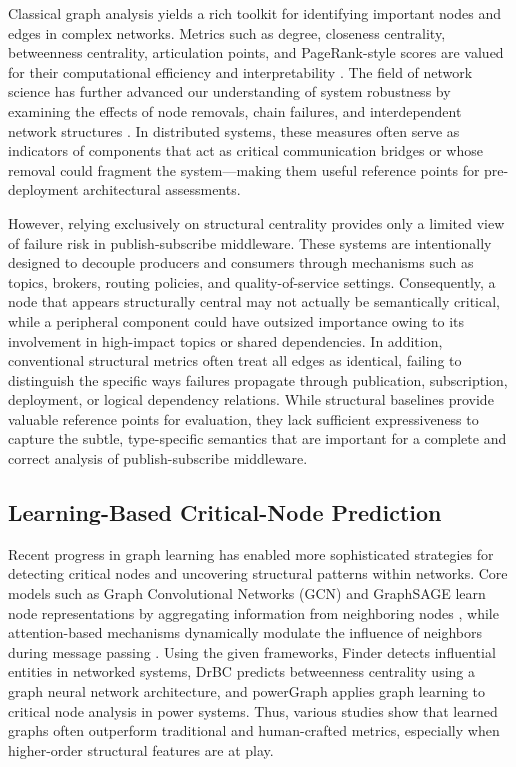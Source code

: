 \documentclass[sigconf,9pt,anonymous]{acmart}
\begin{document}
Classical graph analysis yields a rich toolkit for identifying important nodes and edges in complex networks. Metrics such as degree, closeness centrality, betweenness centrality, articulation points, and PageRank-style scores are valued for their computational efficiency and interpretability \cite{freeman1977centrality, brandes2001faster, brin1998anatomy}. The field of network science has further advanced our understanding of system robustness by examining the effects of node removals, chain failures, and interdependent network structures \cite{albert2000error, buldyrev2010catastrophic}. In distributed systems, these measures often serve as indicators of components that act as critical communication bridges or whose removal could fragment the system—making them useful reference points for pre-deployment architectural assessments.

However, relying exclusively on structural centrality provides only a limited view of failure risk in publish-subscribe middleware. These systems are intentionally designed to decouple producers and consumers through mechanisms such as topics, brokers, routing policies, and quality-of-service settings. Consequently, a node that appears structurally central may not actually be semantically critical, while a peripheral component could have outsized importance owing to its involvement in high-impact topics or shared dependencies. In addition, conventional structural metrics often treat all edges as identical, failing to distinguish the specific ways failures propagate through publication, subscription, deployment, or logical dependency relations. While structural baselines provide valuable reference points for evaluation, they lack sufficient expressiveness to capture the subtle, type-specific semantics that are important for a complete and correct analysis of publish-subscribe middleware.

\subsection{Learning-Based Critical-Node Prediction}

Recent progress in graph learning has enabled more sophisticated strategies for detecting critical nodes and uncovering structural patterns within networks. Core models such as Graph Convolutional Networks (GCN) and GraphSAGE learn node representations by aggregating information from neighboring nodes \cite{kipf2017gcn, hamilton2017inductive}, while attention-based mechanisms dynamically modulate the influence of neighbors during message passing \cite{velickovic2018gat}. Using the given frameworks, Finder \cite{fan2020finder} detects influential entities in networked systems, DrBC \cite{munikoti2022drbc} predicts betweenness centrality using a graph neural network architecture, and powerGraph \cite{munikoti2024powergraph} applies graph learning to critical node analysis in power systems. Thus, various studies show that learned graphs often outperform traditional and human-crafted metrics, especially when higher-order structural features are at play.
\end{document}
